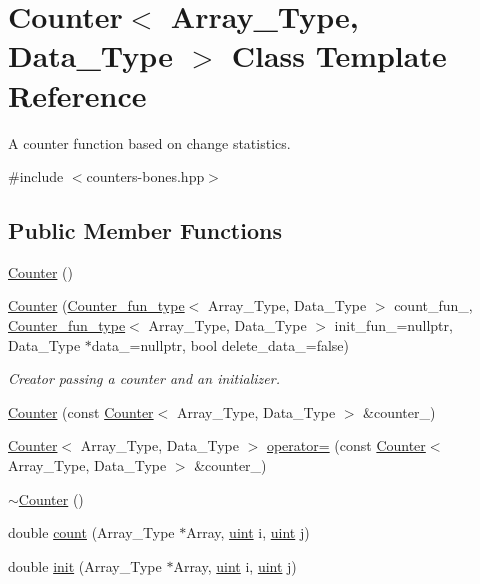 \hypertarget{class_counter}{}\section{Counter$<$ Array\+\_\+\+Type, Data\+\_\+\+Type $>$ Class Template Reference}
\label{class_counter}


A counter function based on change statistics.  




{\ttfamily \#include $<$counters-\/bones.\+hpp$>$}

\subsection*{Public Member Functions}
\begin{DoxyCompactItemize}
\item 
\hyperlink{class_counter_a56c2f4ad875497dea97934cd3ddebc81}{Counter} ()
\item 
\hyperlink{class_counter_ad2a63c2b9b6c593d292dfd47e2f7a780}{Counter} (\hyperlink{typedefs_8hpp_ac0160f52f564dea3ac033b374cffbfe7}{Counter\+\_\+fun\+\_\+type}$<$ Array\+\_\+\+Type, Data\+\_\+\+Type $>$ count\+\_\+fun\+\_\+, \hyperlink{typedefs_8hpp_ac0160f52f564dea3ac033b374cffbfe7}{Counter\+\_\+fun\+\_\+type}$<$ Array\+\_\+\+Type, Data\+\_\+\+Type $>$ init\+\_\+fun\+\_\+=nullptr, Data\+\_\+\+Type $\ast$data\+\_\+=nullptr, bool delete\+\_\+data\+\_\+=false)
\begin{DoxyCompactList}\small\item\em Creator passing a counter and an initializer. \end{DoxyCompactList}\item 
\hyperlink{class_counter_a89aa39dd007b8aa1bcde97519d516806}{Counter} (const \hyperlink{class_counter}{Counter}$<$ Array\+\_\+\+Type, Data\+\_\+\+Type $>$ \&counter\+\_\+)
\item 
\hyperlink{class_counter}{Counter}$<$ Array\+\_\+\+Type, Data\+\_\+\+Type $>$ \hyperlink{class_counter_a058b8f695d6b6493c5d03aee8c01a86c}{operator=} (const \hyperlink{class_counter}{Counter}$<$ Array\+\_\+\+Type, Data\+\_\+\+Type $>$ \&counter\+\_\+)
\item 
\hyperlink{class_counter_a66594b4ffbbf337241b032c1f039b3c0}{$\sim$\+Counter} ()
\item 
double \hyperlink{class_counter_afe1d23e72c3bdca9b2481f36ebde1d95}{count} (Array\+\_\+\+Type $\ast$Array, \hyperlink{typedefs_8hpp_a91ad9478d81a7aaf2593e8d9c3d06a14}{uint} i, \hyperlink{typedefs_8hpp_a91ad9478d81a7aaf2593e8d9c3d06a14}{uint} j)
\item 
double \hyperlink{class_counter_ae0451979ddc51a5fbf00de78c37d3216}{init} (Array\+\_\+\+Type $\ast$Array, \hyperlink{typedefs_8hpp_a91ad9478d81a7aaf2593e8d9c3d06a14}{uint} i, \hyperlink{typedefs_8hpp_a91ad9478d81a7aaf2593e8d9c3d06a14}{uint} j)
\end{DoxyCompactItemize}
